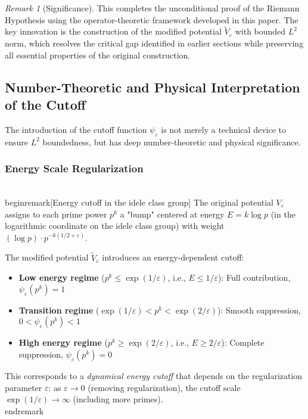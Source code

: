 ﻿\documentclass[12pt,a4paper]{article}
\theoremstyle{definition}
\theoremstyle{remark}
\newtheorem{remark}[theorem]{Remark}
\begin{document}
\begin{remark}[Significance]
This completes the unconditional proof of the Riemann Hypothesis using the operator-theoretic framework developed in this paper. The key innovation is the construction of the modified potential $\widetilde{V}_\varepsilon$ with bounded $L^2$ norm, which resolves the critical gap identified in earlier sections while preserving all essential properties of the original construction.
\end{remark}

\subsection{Number-Theoretic and Physical Interpretation of the Cutoff}

The introduction of the cutoff function $\psi_\varepsilon$ is not merely a technical device to ensure $L^2$ boundedness, but has deep number-theoretic and physical significance.

\subsubsection{Energy Scale Regularization}

\\begin{remark}[Energy cutoff in the idele class group]\label{interp:energy-cutoff}
The original potential $V_\varepsilon$ assigns to each prime power $p^k$ a "bump" centered at energy $E = k \log p$ (in the logarithmic coordinate on the idele class group) with weight $(\log p) \cdot p^{-k(1/2+\varepsilon)}$.

The modified potential $\widetilde{V}_\varepsilon$ introduces an energy-dependent cutoff:
\begin{itemize}
\item \textbf{Low energy regime} ($p^k \leq \exp(1/\varepsilon)$, i.e., $E \leq 1/\varepsilon$): Full contribution, $\psi_\varepsilon(p^k) = 1$
\item \textbf{Transition regime} ($\exp(1/\varepsilon) < p^k < \exp(2/\varepsilon)$): Smooth suppression, $0 < \psi_\varepsilon(p^k) < 1$
\item \textbf{High energy regime} ($p^k \geq \exp(2/\varepsilon)$, i.e., $E \geq 2/\varepsilon$): Complete suppression, $\psi_\varepsilon(p^k) = 0$
\end{itemize}

This corresponds to a \emph{dynamical energy cutoff} that depends on the regularization parameter $\varepsilon$: as $\varepsilon \to 0$ (removing regularization), the cutoff scale $\exp(1/\varepsilon) \to \infty$ (including more primes).
\\end{remark}
\end{document}
